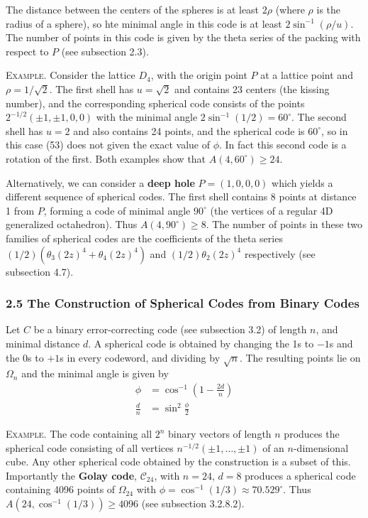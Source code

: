 \documentclass{article}
\renewcommand{\i}{^{-1}}
\newcommand{\degrees}{^\circ}
\newcommand{\ass}[1]{\left( #1 \right)}
\newcommand{\Golay}{\mathcal{C}_{24}}
\newcommand{\header}[1]{\noindent\textsc{#1.} }
\begin{document}
The distance between the centers of the spheres is at least $2 \rho$ (where $\rho$ is the radius of a sphere), so hte minimal angle in this code is at least $2 \sin\i(\rho / u)$. The number of points in this code is given by the theta series of the packing with respect to $P$ (see subsection 2.3).

\header{Example}
Consider the lattice $D_4$, with the origin point $P$ at a lattice point and $\rho = 1/\sqrt{2}$.
The first shell has $u = \sqrt 2$ and contains 23 centers (the kissing number), and the corresponding spherical code consists of the points $2^{-1/2} (\pm 1, \pm 1, 0, 0)$ with the minimal angle $2 \sin\i (1/2) = 60\degrees$.
The second shell has $u = 2$ and also contains 24 points, and the spherical code is $60\degrees$, so in this case (53) does not given the exact value of $\phi$. In fact this second code is a rotation of the first.
Both examples show that $A(4, 60\degrees) \geq 24$.

Alternatively, we can consider a \textbf{deep hole} $P = (1,0,0,0)$ which yields a different sequence of spherical codes.
The first shell contains 8 points at distance 1 from $P$, forming a code of minimal angle $90\degrees$ (the vertices of a regular 4D generalized octahedron).
Thus $A(4, 90\degrees) \geq 8$.
The number of points in these two families of spherical codes are the coefficients of the theta series
$(1/2)( \theta_3 (2z)^4 + \theta_4 (2z)^4 )$ and $(1/2) \theta_2 (2z)^4$ respectively (see subsection 4.7).

\subsubsection*{2.5 The Construction of Spherical Codes from Binary Codes}

Let $C$ be a binary error-correcting code (see subsection 3.2) of length $n$, and minimal distance $d$.
A spherical code is obtained by changing the 1s to $-1$s and the 0s to $+1$s in every codeword, and dividing by $\sqrt n$. The resulting points lie on $\Omega_n$ and the minimal angle is given by
\begin{align*}
  \phi &= \cos\i\ass{ 1 - \frac{2d}{n} } \\
  \frac{d}{n} &= \sin^2 \frac{\phi}{2}
\end{align*}

\header{Example}
The code containing all $2^n$ binary vectors of length $n$ produces the spherical code consisting of all vertices $n^{-1/2}(\pm 1, \dots, \pm 1)$ of an $n$-dimensional cube. Any other spherical code obtained by the construction is a subset of this.
Importantly the \textbf{Golay code}, $\Golay$, with $n = 24$, $d = 8$ produces a spherical code containing 4096 points of $\Omega_{24}$ with $\phi = \cos\i(1/3) \approx 70.529\degrees$. Thus $A(24, \cos\i(1/3)) \geq 4096$ (see subsection 3.2.8.2).
\end{document}
